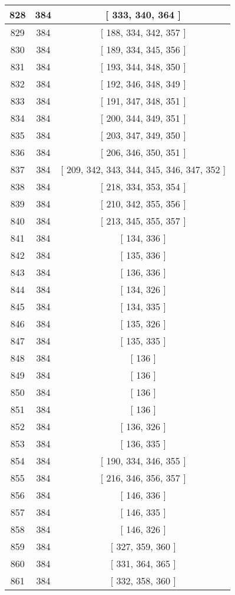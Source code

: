 \begin{center}
\begin{longtable}[H]{|| c c c ||}
828 & 384 & [ 333, 340, 364 ]
\\\hline
829 & 384 & [ 188, 334, 342, 357 ]
\\\hline
830 & 384 & [ 189, 334, 345, 356 ]
\\\hline
831 & 384 & [ 193, 344, 348, 350 ]
\\\hline
832 & 384 & [ 192, 346, 348, 349 ]
\\\hline
833 & 384 & [ 191, 347, 348, 351 ]
\\\hline
834 & 384 & [ 200, 344, 349, 351 ]
\\\hline
835 & 384 & [ 203, 347, 349, 350 ]
\\\hline
836 & 384 & [ 206, 346, 350, 351 ]
\\\hline
837 & 384 & [ 209, 342, 343, 344, 345, 346, 347, 352 ]
\\\hline
838 & 384 & [ 218, 334, 353, 354 ]
\\\hline
839 & 384 & [ 210, 342, 355, 356 ]
\\\hline
840 & 384 & [ 213, 345, 355, 357 ]
\\\hline
841 & 384 & [ 134, 336 ]
\\\hline
842 & 384 & [ 135, 336 ]
\\\hline
843 & 384 & [ 136, 336 ]
\\\hline
844 & 384 & [ 134, 326 ]
\\\hline
845 & 384 & [ 134, 335 ]
\\\hline
846 & 384 & [ 135, 326 ]
\\\hline
847 & 384 & [ 135, 335 ]
\\\hline
848 & 384 & [ 136 ]
\\\hline
849 & 384 & [ 136 ]
\\\hline
850 & 384 & [ 136 ]
\\\hline
851 & 384 & [ 136 ]
\\\hline
852 & 384 & [ 136, 326 ]
\\\hline
853 & 384 & [ 136, 335 ]
\\\hline
854 & 384 & [ 190, 334, 346, 355 ]
\\\hline
855 & 384 & [ 216, 346, 356, 357 ]
\\\hline
856 & 384 & [ 146, 336 ]
\\\hline
857 & 384 & [ 146, 335 ]
\\\hline
858 & 384 & [ 146, 326 ]
\\\hline
859 & 384 & [ 327, 359, 360 ]
\\\hline
860 & 384 & [ 331, 364, 365 ]
\\\hline
861 & 384 & [ 332, 358, 360 ]

\end{longtable}
\end{center}
